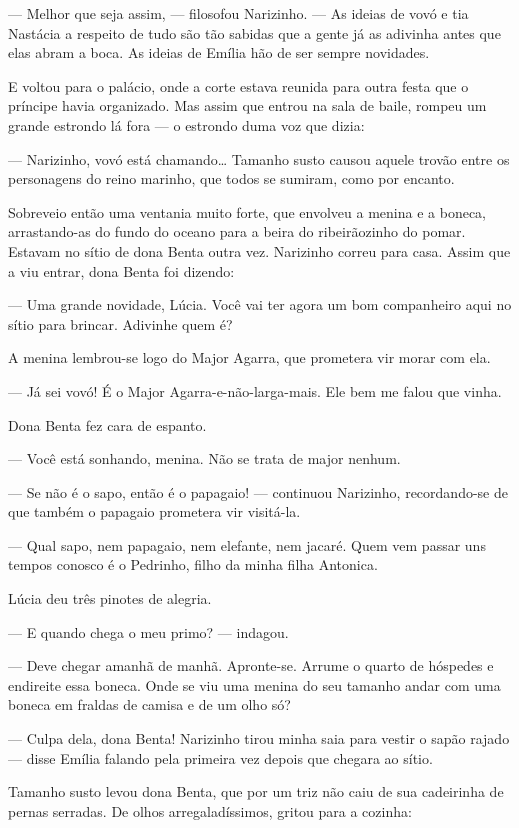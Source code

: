 --- Melhor que seja assim, --- filosofou Narizinho. --- As ideias de
vovó e tia Nastácia a respeito de tudo são tão sabidas que a gente já as
adivinha antes que elas abram a boca. As ideias de Emília hão de ser
sempre novidades.

E voltou para o palácio, onde a corte estava reunida para outra festa
que o príncipe havia organizado. Mas assim que entrou na sala de baile,
rompeu um grande estrondo lá fora --- o estrondo duma voz que dizia:

--- Narizinho, vovó está chamando\ldots{} Tamanho susto causou aquele
trovão entre os personagens do reino marinho, que todos se sumiram, como
por encanto.

Sobreveio então uma ventania muito forte, que envolveu a menina e a
boneca, arrastando-as do fundo do oceano para a beira do ribeirãozinho
do pomar. Estavam no sítio de dona Benta outra vez. Narizinho correu
para casa. Assim que a viu entrar, dona Benta foi dizendo:

--- Uma grande novidade, Lúcia. Você vai ter agora um bom companheiro
aqui no sítio para brincar. Adivinhe quem é?

A menina lembrou-se logo do Major Agarra, que prometera vir morar com
ela.

--- Já sei vovó! É o Major Agarra-e-não-larga-mais. Ele bem me falou que
vinha.

Dona Benta fez cara de espanto.

--- Você está sonhando, menina. Não se trata de major nenhum.

--- Se não é o sapo, então é o papagaio! --- continuou Narizinho,
recordando-se de que também o papagaio prometera vir visitá-la.

--- Qual sapo, nem papagaio, nem elefante, nem jacaré. Quem vem passar
uns tempos conosco é o Pedrinho, filho da minha filha Antonica.

Lúcia deu três pinotes de alegria.

--- E quando chega o meu primo? --- indagou.

--- Deve chegar amanhã de manhã. Apronte-se. Arrume o quarto de hóspedes
e endireite essa boneca. Onde se viu uma menina do seu tamanho andar com
uma boneca em fraldas de camisa e de um olho só?

--- Culpa dela, dona Benta! Narizinho tirou minha saia para vestir o
sapão rajado --- disse Emília falando pela primeira vez depois que
chegara ao sítio.

Tamanho susto levou dona Benta, que por um triz não caiu de sua
cadeirinha de pernas serradas. De olhos arregaladíssimos, gritou para a
cozinha:

